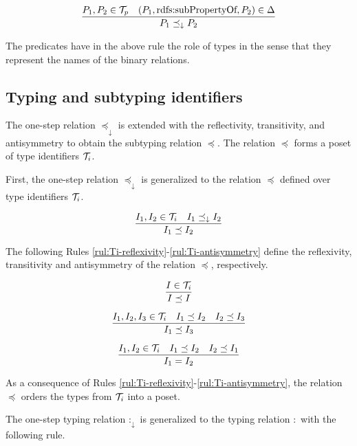 \documentclass[runningheads]{llncs}
\newcommand{\darr}{\downarrow}
\newcommand{\T}{{\cal T}}
\begin{document}
\begin{equation}
\dfrac{P_1,P_2\in\T_p \quad (P_1,\text{rdfs:subPropertyOf},P_2)\in\D}
      {P_1\preceq_\darr\/P_2}
\end{equation}

The predicates have in the above rule the role of types in the sense
that they represent the names of the binary relations. 



\subsection{Typing and subtyping identifiers\label{sec:idents-typing}}

The one-step relation $\preceq_\darr$ is extended with the
reflectivity, transitivity, and antisymmetry to obtain the subtyping
relation $\preceq$. The relation $\preceq$ forms a poset of type
identifiers $\T_i$.

First, the one-step relation $\preceq_\darr$ is generalized to the
relation $\preceq$ defined over type identifiers $\T_i$.

\begin{equation}
\label{rul:Ic-extended}
\dfrac{I_1,I_2\in\T_i \quad I_1\preceq_\darr\/I_2}
      {I_1 \preceq I_2}
\end{equation}

The following Rules \ref{rul:Ti-reflexivity}-\ref{rul:Ti-antisymmetry}
define the reflexivity, transitivity and antisymmetry of the
relation $\preceq$, respectively.

\begin{equation}
\label{rul:Ti-reflexivity}
\dfrac{I\in\T_i}
      {I\preceq\/I}
\end{equation}

\begin{equation}
\label{rul:Ti-transitivity}
\dfrac{I_1,I_2,I_3\in\T_i\quad\/I_1\preceq\/I_2\quad\/I_2\preceq\/I_3}
      {I_1\preceq\/I_3}   
\end{equation}

\begin{equation}
\label{rul:Ti-antisymmetry}
\dfrac{I_1,I_2\in\T_i \quad I_1\preceq\/I_2 \quad I_2\preceq\/I_1}
      {I_1=I_2}   
\end{equation}

\noindent
As a consequence of Rules
\ref{rul:Ti-reflexivity}-\ref{rul:Ti-antisymmetry}, the relation
$\preceq$ orders the types from $\T_i$ into a poset.

The one-step typing relation $:_\darr$ is generalized to the typing
relation $:$ with the following rule.
\end{document}
